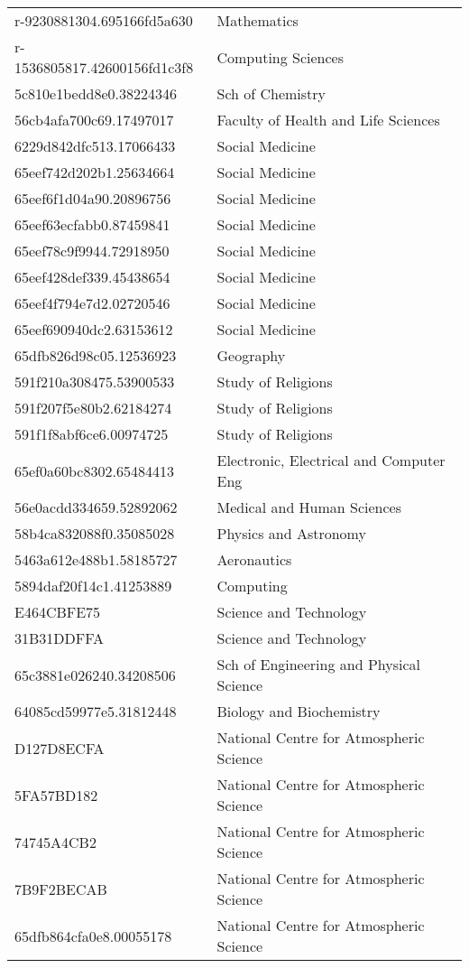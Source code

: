 \begin{tabular}{ll}
r-9230881304.695166fd5a630 & Mathematics \\
r-1536805817.42600156fd1c3f8 & Computing Sciences \\
5c810e1bedd8e0.38224346 & Sch of Chemistry \\
56cb4afa700c69.17497017 & Faculty of Health and Life Sciences \\
6229d842dfc513.17066433 & Social Medicine \\
65eef742d202b1.25634664 & Social Medicine \\
65eef6f1d04a90.20896756 & Social Medicine \\
65eef63ecfabb0.87459841 & Social Medicine \\
65eef78c9f9944.72918950 & Social Medicine \\
65eef428def339.45438654 & Social Medicine \\
65eef4f794e7d2.02720546 & Social Medicine \\
65eef690940dc2.63153612 & Social Medicine \\
65dfb826d98c05.12536923 & Geography \\
591f210a308475.53900533 & Study of Religions \\
591f207f5e80b2.62184274 & Study of Religions \\
591f1f8abf6ce6.00974725 & Study of Religions \\
65ef0a60bc8302.65484413 & Electronic, Electrical and Computer Eng \\
56e0acdd334659.52892062 & Medical and Human Sciences \\
58b4ca832088f0.35085028 & Physics and Astronomy \\
5463a612e488b1.58185727 & Aeronautics \\
5894daf20f14c1.41253889 & Computing \\
E464CBFE75 & Science and Technology \\
31B31DDFFA & Science and Technology \\
65c3881e026240.34208506 & Sch of Engineering and Physical Science \\
64085cd59977e5.31812448 & Biology and Biochemistry \\
D127D8ECFA & National Centre for Atmospheric Science \\
5FA57BD182 & National Centre for Atmospheric Science \\
74745A4CB2 & National Centre for Atmospheric Science \\
7B9F2BECAB & National Centre for Atmospheric Science \\
65dfb864cfa0e8.00055178 & National Centre for Atmospheric Science \\

\end{tabular}
